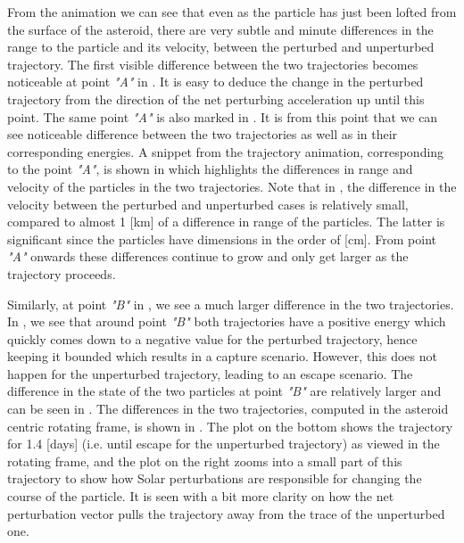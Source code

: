 \FloatBarrier
From the animation we can see that even as the particle has just been lofted from the surface of the asteroid, there are very subtle and minute differences in the range to the particle and its velocity, between the perturbed and unperturbed trajectory. The first visible difference between the two trajectories becomes noticeable at point \textit{"A"} in . It is easy to deduce the change in the perturbed trajectory from the direction of the net perturbing acceleration up until this point. The same point \textit{"A"} is also marked in . It is from this point that we can see noticeable difference between the two trajectories as well as in their corresponding energies. A snippet from the trajectory animation, corresponding to the point \textit{"A"}, is shown in  which highlights the differences in range and velocity of the particles in the two trajectories. Note that in , the difference in the velocity between the perturbed and unperturbed cases is relatively small, compared to almost 1 [km] of a difference in range of the particles. The latter is significant since the particles have dimensions in the order of [cm]. From point \textit{"A"} onwards these differences continue to grow and only get larger as the trajectory proceeds.

Similarly, at point \textit{"B"} in , we see a much larger difference in the two trajectories. In , we see that around point \textit{"B"} both trajectories have a positive energy which quickly comes down to a negative value for the perturbed trajectory, hence keeping it bounded which results in a capture scenario. However, this does not happen for the unperturbed trajectory, leading to an escape scenario. The difference in the state of the two particles at point \textit{"B"} are relatively larger and can be seen in . The differences in the two trajectories, computed in the asteroid centric rotating frame, is shown in . The plot on the bottom shows the trajectory for 1.4 [days] (i.e. until escape for the unperturbed trajectory) as viewed in the rotating frame, and the plot on the right zooms into a small part of this trajectory to show how Solar perturbations are responsible for changing the course of the particle. It is seen with a bit more clarity on how the net perturbation vector pulls the trajectory away from the trace of the unperturbed one.

